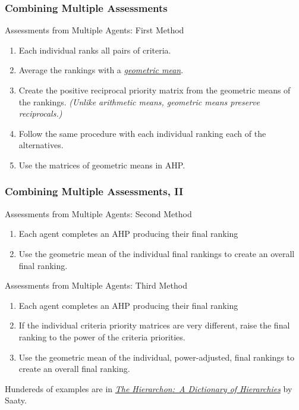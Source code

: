 \documentclass[10pt,handout,hyperref={colorlinks=true,linkcolor=blue,citecolor=citelink,urlcolor=gray}]{beamer}
\newcounter{e_temp}
\begin{document}
\begin{frame}[label=MultipleAssessments]
\frametitle{Combining Multiple Assessments}
\begin{block}{Assessments from Multiple Agents: First Method}
\vspace{0.75ex}
\begin{enumerate}
\setlength{\itemsep}{2ex}
\item Each individual ranks all pairs of criteria.
\pause
\item Average the rankings with a \href{http://en.wikipedia.org/wiki/Geometric_mean}{\it geometric mean}\footnotemark.
\pause
\item Create the positive reciprocal priority matrix from the geometric means of the rankings.\newline
	{\it \footnotesize (Unlike arithmetic means, geometric means preserve reciprocals.)}
\pause
\item Follow the same procedure with each individual ranking each of the alternatives.
\pause
\item Use the matrices of geometric means in AHP. 
\vspace{0.75ex}
\end{enumerate}
\end{block}
\end{frame}

\begin{frame}
\frametitle{Combining Multiple Assessments, II}
\begin{block}{Assessments from Multiple Agents: Second Method}
\begin{enumerate}
\item Each agent completes an AHP producing their final ranking
\item Use the geometric mean of the individual final rankings to create an overall final ranking.
\end{enumerate}
\end{block}
\pause
\vfill

\begin{block}{Assessments from Multiple Agents: Third Method}
\begin{enumerate}
\item Each agent completes an AHP producing their final ranking
\item If the individual criteria priority matrices are very different, raise the final ranking to the power of the criteria priorities.
\item Use the geometric mean of the individual, power-adjusted, final rankings to create an overall final ranking.
\end{enumerate}
\end{block}
\vfill
\centerline{\small Hundereds of examples are in \href{http://books.google.com/books?id=c8KqSWPFwIUC&lpg=PT331&dq=The\%20Hierarchon\%3A\%20A\%20Dictionary\%20of\%20Hierarchies&pg=PT331\#v=onepage&q&f=false}{\it The Hierarchon:~A Dictionary of Hierarchies} by Saaty.}
\end{frame}
\end{document}
